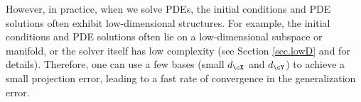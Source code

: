 \documentclass[11pt]{article} %
\begin{document}

However, in practice, when we solve PDEs, the initial conditions and PDE solutions often exhibit low-dimensional structures. For example, the initial conditions and PDE solutions often lie on a low-dimensional subspace or manifold, or the solver itself has low complexity (see Section \ref{sec.lowD} and \citep{haasdonk2017reduced,rozza2014fundamentals} for details). Therefore, one can use a few bases (small $d_{\cX}$ and $d_{\cY}$) to achieve a small projection error, leading to a fast rate of convergence in the generalization error.





\end{document}
